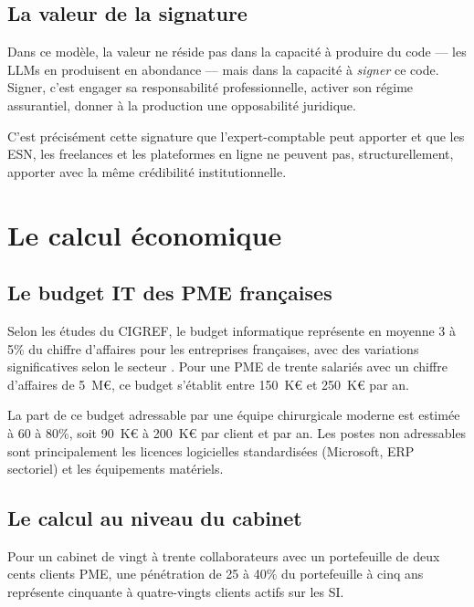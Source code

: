 \documentclass[12pt,a4paper]{article}
\begin{document}
\subsection{La valeur de la signature}

Dans ce modèle, la valeur ne réside pas dans la capacité à produire du code --- les LLMs en produisent en abondance --- mais dans la capacité à \emph{signer} ce code. Signer, c'est engager sa responsabilité professionnelle, activer son régime assurantiel, donner à la production une opposabilité juridique.

C'est précisément cette signature que l'expert-comptable peut apporter et que les ESN, les freelances et les plateformes en ligne ne peuvent pas, structurellement, apporter avec la même crédibilité institutionnelle.

\section{Le calcul économique}

\subsection{Le budget IT des PME françaises}

Selon les études du CIGREF, le budget informatique représente en moyenne 3 à 5\% du chiffre d'affaires pour les entreprises françaises, avec des variations significatives selon le secteur \parencite{cigref2023}. Pour une PME de trente salariés avec un chiffre d'affaires de 5~M€, ce budget s'établit entre 150~K€ et 250~K€ par an.

La part de ce budget adressable par une équipe chirurgicale moderne est estimée à 60 à 80\%, soit 90~K€ à 200~K€ par client et par an. Les postes non adressables sont principalement les licences logicielles standardisées (Microsoft, ERP sectoriel) et les équipements matériels.

\subsection{Le calcul au niveau du cabinet}

Pour un cabinet de vingt à trente collaborateurs avec un portefeuille de deux cents clients PME, une pénétration de 25 à 40\% du portefeuille à cinq ans représente cinquante à quatre-vingts clients actifs sur les SI.
\end{document}
